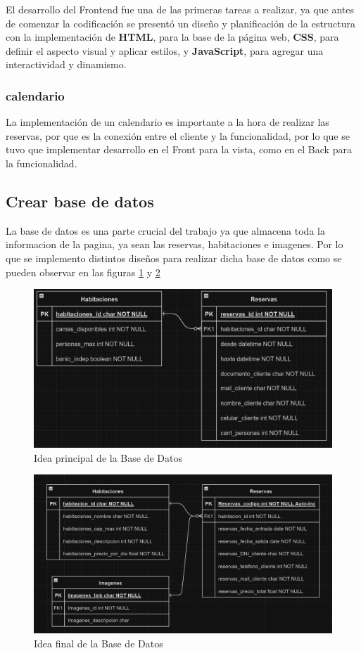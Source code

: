 El desarrollo del Frontend fue una de las primeras tareas a realizar, ya que antes de comenzar la codificación se presentó un diseño y planificación de la estructura con la implementación de \textbf{HTML}, para la base de la página web, \textbf{CSS}, para definir el aspecto visual y aplicar estilos, y \textbf{JavaScript}, para agregar una interactividad y dinamismo.


\subsubsection{calendario}

La implementación de un calendario es importante a la hora de realizar las reservas, por que es la conexión entre el cliente y la funcionalidad, por lo que se tuvo que implementar desarrollo en el Front para la vista, como en el Back para la funcionalidad.


\subsection{Crear base de datos}


La base de datos es una parte crucial del trabajo ya que almacena toda la informacion de la pagina, ya sean las reservas, habitaciones e imagenes. Por lo que se implemento distintos diseños para realizar dicha base de datos como se pueden observar en las figuras \ref{fig:BD1} y \ref{fig:BD2}



\begin{figure}
    \centering
    \includegraphics[width=0.75\linewidth]{images/base de datos 1.png}
    \caption{Idea principal de la Base de Datos}
    \label{fig:BD1}
\end{figure}


\begin{figure}
    \centering
    \includegraphics[width=0.75\linewidth]{images/base de datos final.png}
    \caption{Idea final de la Base de Datos}
    \label{fig:BD2}
\end{figure}


